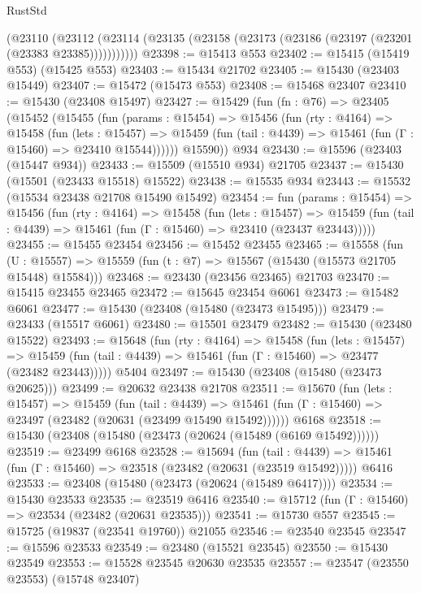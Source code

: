 \begin{lexlean}{RustStd}
\begin{coremodule}
      (@23110
        (@23112 (@23114 (@23135 (@23158 (@23173 (@23186 (@23197 (@23201 (@23383 @23385)))))))))))
@23398 := @15413 @553
@23402 := @15415 (@15419 @553) (@15425 @553)
@23403 := @15434 @21702
@23405 := @15430 (@23403 @15449)
@23407 := @15472 (@15473 @553)
@23408 := @15468 @23407
@23410 := @15430 (@23408 @15497)
@23427 := @15429
    (fun (fn : @76) =>
    @23405
      (@15452
        (@15455
          (fun (params : @15454) =>
          @15456
            (fun (rty : @4164) =>
            @15458
              (fun (lets : @15457) =>
              @15459 (fun (tail : @4439) => @15461 (fun (Γ : @15460) => @23410 @15544))))))
        @15590))
    @934
@23430 := @15596 (@23403 (@15447 @934))
@23433 := @15509 (@15510 @934) @21705
@23437 := @15430 (@15501 (@23433 @15518) @15522)
@23438 := @15535 @934
@23443 := @15532 (@15534 @23438 @21708 @15490 @15492)
@23454 := fun (params : @15454) =>
  @15456
    (fun (rty : @4164) =>
    @15458
      (fun (lets : @15457) =>
      @15459 (fun (tail : @4439) => @15461 (fun (Γ : @15460) => @23410 (@23437 @23443)))))
@23455 := @15455 @23454
@23456 := @15452 @23455
@23465 := @15558
    (fun (U : @15557) => @15559 (fun (t : @7) => @15567 (@15430 (@15573 @21705 @15448) @15584)))
@23468 := @23430 (@23456 @23465) @21703
@23470 := @15415 @23455 @23465
@23472 := @15645 @23454 @6061
@23473 := @15482 @6061
@23477 := @15430 (@23408 (@15480 (@23473 @15495)))
@23479 := @23433 (@15517 @6061)
@23480 := @15501 @23479
@23482 := @15430 (@23480 @15522)
@23493 := @15648
    (fun (rty : @4164) =>
    @15458
      (fun (lets : @15457) =>
      @15459 (fun (tail : @4439) => @15461 (fun (Γ : @15460) => @23477 (@23482 @23443)))))
    @5404
@23497 := @15430 (@23408 (@15480 (@23473 @20625)))
@23499 := @20632 @23438 @21708
@23511 := @15670
    (fun (lets : @15457) =>
    @15459
      (fun (tail : @4439) =>
      @15461 (fun (Γ : @15460) => @23497 (@23482 (@20631 (@23499 @15490 @15492))))))
    @6168
@23518 := @15430 (@23408 (@15480 (@23473 (@20624 (@15489 (@6169 @15492))))))
@23519 := @23499 @6168
@23528 := @15694
    (fun (tail : @4439) => @15461 (fun (Γ : @15460) => @23518 (@23482 (@20631 (@23519 @15492)))))
    @6416
@23533 := @23408 (@15480 (@23473 (@20624 (@15489 @6417))))
@23534 := @15430 @23533
@23535 := @23519 @6416
@23540 := @15712 (fun (Γ : @15460) => @23534 (@23482 (@20631 @23535)))
@23541 := @15730 @557
@23545 := @15725 (@19837 (@23541 @19760)) @21055
@23546 := @23540 @23545
@23547 := @15596 @23533
@23549 := @23480 (@15521 @23545)
@23550 := @15430 @23549
@23553 := @15528 @23545 @20630 @23535
@23557 := @23547 (@23550 @23553) (@15748 @23407)

\end{coremodule}
\end{lexlean}

